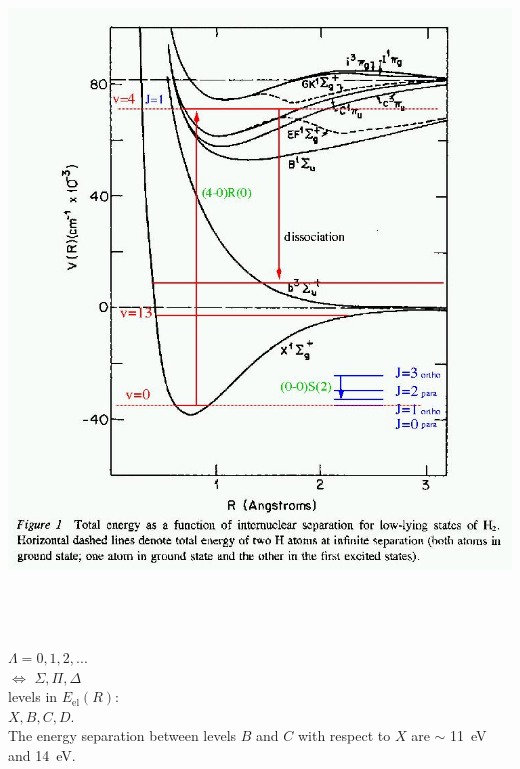 \foilhead{}

\begin{minipage}[t]{15cm}
\includegraphics[width=!,height=18cm]{./B/h2_levels_xv.jpg}
\end{minipage}
\hfill
\begin{minipage}[t]{10cm}
\vspace{-18cm}
$\Lambda = 0, 1, 2, ... $\\ $\Leftrightarrow$ $ \Sigma, \Pi, \Delta$ \\
levels in  $E_\mathrm{el}(R)$:\\ $X,B,C,D$.\\

The energy separation between levels $B$ and $C$ with respect to $X$
are $\sim$ 11~eV and 14~eV.  \\
\end{minipage}
\vfill

